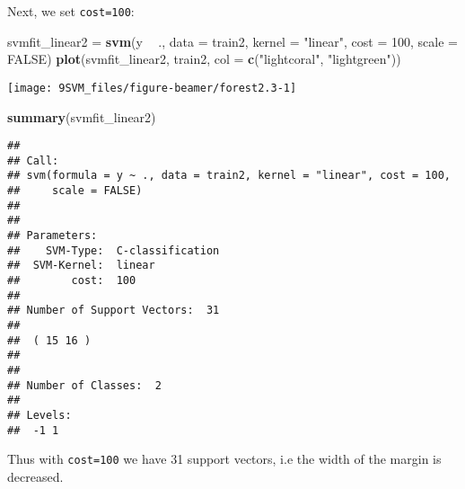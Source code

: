 \documentclass[10pt,ignorenonframetext,]{beamer}
\newenvironment{Shaded}{\begin{snugshade}}{\end{snugshade}}
\newcommand{\KeywordTok}[1]{\textcolor[rgb]{0.13,0.29,0.53}{\textbf{#1}}}
\newcommand{\DataTypeTok}[1]{\textcolor[rgb]{0.13,0.29,0.53}{#1}}
\newcommand{\DecValTok}[1]{\textcolor[rgb]{0.00,0.00,0.81}{#1}}
\newcommand{\StringTok}[1]{\textcolor[rgb]{0.31,0.60,0.02}{#1}}
\newcommand{\OtherTok}[1]{\textcolor[rgb]{0.56,0.35,0.01}{#1}}
\newcommand{\OperatorTok}[1]{\textcolor[rgb]{0.81,0.36,0.00}{\textbf{#1}}}
\newcommand{\NormalTok}[1]{#1}
\begin{document}
\begin{frame}[fragile]

Next, we set \texttt{cost=100}:

\scriptsize

\begin{Shaded}
\begin{Highlighting}[]
\NormalTok{svmfit_linear2 =}\StringTok{ }\KeywordTok{svm}\NormalTok{(y }\OperatorTok{~}\StringTok{ }\NormalTok{., }\DataTypeTok{data =}\NormalTok{ train2, }\DataTypeTok{kernel =} \StringTok{"linear"}\NormalTok{, }\DataTypeTok{cost =} \DecValTok{100}\NormalTok{, }
    \DataTypeTok{scale =} \OtherTok{FALSE}\NormalTok{)}
\KeywordTok{plot}\NormalTok{(svmfit_linear2, train2, }\DataTypeTok{col =} \KeywordTok{c}\NormalTok{(}\StringTok{"lightcoral"}\NormalTok{, }\StringTok{"lightgreen"}\NormalTok{))}
\end{Highlighting}
\end{Shaded}

\begin{center}\texttt{[image: 9SVM\_files/figure-beamer/forest2.3-1]} \end{center}

\end{frame}

\begin{frame}[fragile]

\scriptsize

\begin{Shaded}
\begin{Highlighting}[]
\KeywordTok{summary}\NormalTok{(svmfit_linear2)}
\end{Highlighting}
\end{Shaded}

\begin{verbatim}
## 
## Call:
## svm(formula = y ~ ., data = train2, kernel = "linear", cost = 100, 
##     scale = FALSE)
## 
## 
## Parameters:
##    SVM-Type:  C-classification 
##  SVM-Kernel:  linear 
##        cost:  100 
## 
## Number of Support Vectors:  31
## 
##  ( 15 16 )
## 
## 
## Number of Classes:  2 
## 
## Levels: 
##  -1 1
\end{verbatim}

\normalsize

Thus with \texttt{cost=100} we have 31 support vectors, i.e the width of
the margin is decreased.

\end{frame}
\end{document}
